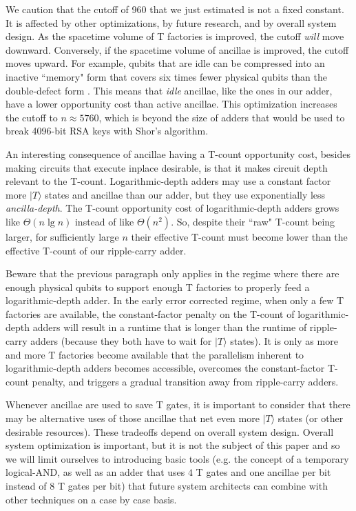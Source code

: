 \documentclass[twocolumn]{quantumarticle-customized}
\begin{document}
We caution that the cutoff of 960 that we just estimated is not a fixed constant.
It is affected by other optimizations, by future research, and by overall system design.
As the spacetime volume of T factories is improved, the cutoff {\em will} move downward.
Conversely, if the spacetime volume of ancillae is improved, the cutoff moves upward.
For example, qubits that are idle can be compressed into an inactive ``memory" form that covers six times fewer physical qubits than the double-defect form \cite{horsman2012}.
This means that {\em idle} ancillae, like the ones in our adder, have a lower opportunity cost than active ancillae.
This optimization increases the cutoff to $n \approx 5760$, which is beyond the size of adders that would be used to break 4096-bit RSA keys with Shor's algorithm.

An interesting consequence of ancillae having a T-count opportunity cost, besides making circuits that execute inplace desirable, is that it makes circuit depth relevant to the T-count.
Logarithmic-depth adders may use a constant factor more $|T\rangle$ states and ancillae than our adder, but they use exponentially less {\em ancilla-depth}.
The T-count opportunity cost of logarithmic-depth adders grows like $\Theta(n \lg n)$ instead of like $\Theta(n^2)$.
So, despite their ``raw" T-count being larger, for sufficiently large $n$ their effective T-count must become lower than the effective T-count of our ripple-carry adder.

Beware that the previous paragraph only applies in the regime where there are enough physical qubits to support enough T factories to properly feed a logarithmic-depth adder.
In the early error corrected regime, when only a few T factories are available, the constant-factor penalty on the T-count of logarithmic-depth adders will result in a runtime that is longer than the runtime of ripple-carry adders (because they both have to wait for $|T\rangle$ states).
It is only as more and more T factories become available that the parallelism inherent to logarithmic-depth adders becomes accessible, overcomes the constant-factor T-count penalty, and triggers a gradual transition away from ripple-carry adders.

Whenever ancillae are used to save T gates, it is important to consider that there may be alternative uses of those ancillae that net even more $|T\rangle$ states (or other desirable resources).
These tradeoffs depend on overall system design.
Overall system optimization is important, but it is not the subject of this paper and so we will limit ourselves to introducing basic tools (e.g. the concept of a temporary logical-AND, as well as an adder that uses $4$ T gates and one ancillae per bit instead of $8$ T gates per bit) that future system architects can combine with other techniques on a case by case basis.
\end{document}
